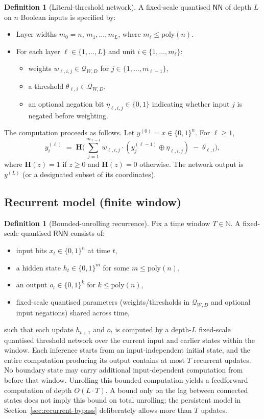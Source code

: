 \documentclass[11pt]{article}
\newcommand{\poly}{\mathrm{poly}}
\newcommand{\Heav}{\mathbf{H}}
\newcommand{\NN}{\mathsf{NN}}
\newcommand{\RNN}{\mathsf{RNN}}
\newcommand{\bits}{\{0,1\}}
\newcommand{\N}{\mathbb{N}}
\newcommand{\Qset}{\mathcal{Q}}
\theoremstyle{plain}
\theoremstyle{definition}
\newtheorem{definition}[theorem]{Definition}
\theoremstyle{remark}
\numberwithin{equation}{section}
\begin{document}
\begin{definition}[Literal-threshold network]
\label{def:NN-formal}
A fixed-scale quantised $\NN$ of depth $L$ on $n$ Boolean inputs is specified by:
\begin{itemize}[leftmargin=*]
\item Layer widths $m_0=n$, $m_1,\dots,m_L$, where $m_\ell\le \poly(n)$.
\item For each layer $\ell\in\{1,\dots,L\}$ and unit $i\in\{1,\dots,m_\ell\}$:
\begin{itemize}[leftmargin=2em]
\item weights $w_{\ell,i,j}\in \Qset_{W,D}$ for $j\in\{1,\dots,m_{\ell-1}\}$,
\item a threshold $\theta_{\ell,i}\in \Qset_{W,D}$,
\item an optional negation bit $\eta_{\ell,i,j}\in\{0,1\}$ indicating whether input $j$ is negated before weighting.
\end{itemize}
\end{itemize}
The computation proceeds as follows. Let $y^{(0)}=x\in\bits^n$. For $\ell\ge 1$,
\[
y^{(\ell)}_i \;=\;
\Heav\!\Big(\sum_{j=1}^{m_{\ell-1}} w_{\ell,i,j}\cdot (y^{(\ell-1)}_j \oplus \eta_{\ell,i,j}) \;-\; \theta_{\ell,i}\Big),
\]
where $\Heav(z)=1$ if $z\ge 0$ and $\Heav(z)=0$ otherwise.
The network output is $y^{(L)}$ (or a designated subset of its coordinates).
\end{definition}

\subsection{Recurrent model (finite window)}
\label{app:RNN}

\begin{definition}[Bounded-unrolling recurrence]
\label{def:RNN-formal}
Fix a time window $T\in\N$.
A fixed-scale quantised $\RNN$ consists of:
\begin{itemize}[leftmargin=*]
\item input bits $x_t\in\bits^n$ at time $t$,
\item a hidden state $h_t\in\bits^{m}$ for some $m\le \poly(n)$,
\item an output $o_t\in\bits^{k}$ for $k\le \poly(n)$,
\item fixed-scale quantised parameters (weights/thresholds in $\Qset_{W,D}$ and optional input negations) shared across time,
\end{itemize}
such that each update $h_{t+1}$ and $o_t$ is computed by a depth-$L$ fixed-scale quantised threshold network over the current input and earlier states within the window.
Each inference starts from an input-independent initial state, and the entire computation producing its output contains at most $T$ recurrent updates. No boundary state may carry additional input-dependent computation from before that window.
Unrolling this bounded computation yields a feedforward computation of depth $O(L\cdot T)$.
A bound only on the lag between connected states does not imply this bound on total unrolling; the persistent model in Section~\ref{sec:recurrent-bypass} deliberately allows more than $T$ updates.
\end{definition}
\end{document}
